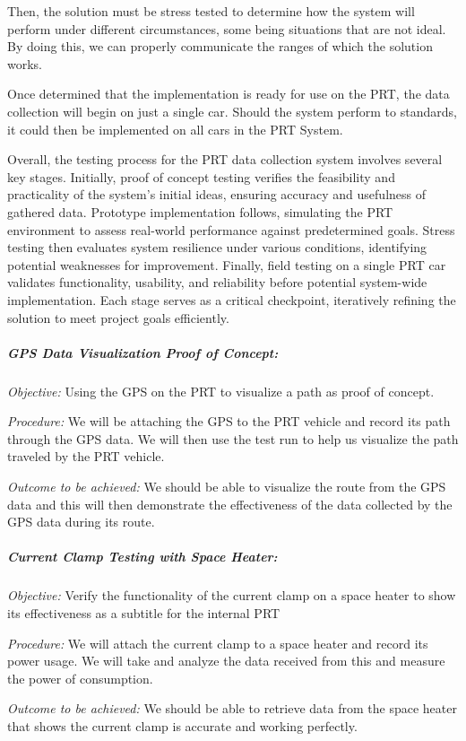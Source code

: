 Then, the solution must be stress tested to determine how the system will perform under different circumstances, some being situations that are not ideal. 
By doing this, we can properly communicate the ranges of which the solution works.

Once determined that the implementation is ready for use on the PRT, the data collection will begin on just a single car. 
Should the system perform to standards, it could then be implemented on all cars in the PRT System.

Overall, the testing process for the PRT data collection system involves several key stages. 
Initially, proof of concept testing verifies the feasibility and practicality of the system's initial ideas, ensuring accuracy and usefulness of gathered data. 
Prototype implementation follows, simulating the PRT environment to assess real-world performance against predetermined goals. 
Stress testing then evaluates system resilience under various conditions, identifying potential weaknesses for improvement. 
Finally, field testing on a single PRT car validates functionality, usability, and reliability before potential system-wide implementation. 
Each stage serves as a critical checkpoint, iteratively refining the solution to meet project goals efficiently.

\subparagraph{GPS Data Visualization Proof of Concept:}
\textit{Objective:} Using the GPS on the PRT to visualize a path as proof of concept.

\textit{Procedure:} We will be attaching the GPS to the PRT vehicle and record its path through the GPS data. We will then use the test run to help us visualize the path traveled by the PRT vehicle.

\textit{Outcome to be achieved:} We should be able to visualize the route from the GPS data and this will then demonstrate the effectiveness of the data collected by the GPS data during its route.

\subparagraph{Current Clamp Testing with Space Heater:}
\textit{Objective:} Verify the functionality of the current clamp on a space heater to show its effectiveness as a subtitle for the internal PRT

\textit{Procedure:} We will attach the current clamp to a space heater and record its power usage. We will take and analyze the data received from this and measure the power of consumption.

\textit{Outcome to be achieved:} We should be able to retrieve data from the space heater that shows the current clamp is accurate and working perfectly.
